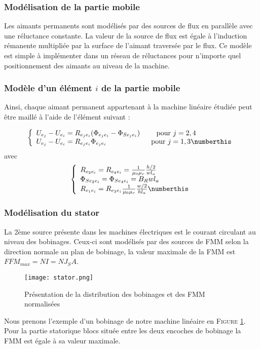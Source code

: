 \subsubsection{Modélisation de la partie mobile}
Les aimants permanents sont modélisés par des sources de flux en parallèle avec une réluctance constante. La valeur de la source de flux est égale à l’induction rémanente
multipliée par la surface de l’aimant traversée par le flux. Ce modèle est simple à implémenter dans un réseau de réluctances pour n’importe quel positionnement des aimants au niveau de la machine.

\subsubsection*{Modèle d'un élément $i$ de la partie mobile}
Ainsi, chaque aimant permanent appartenant à la machine linéaire étudiée peut être maillé à l'aide de l'élément suivant  : 

\[
\left\{
\begin{array}{l c l}
U_{e_j}-U_{e_i}=R_{e_je_i}(\Phi_{e_je_i}-\Phi_{Se_je_i}) \qquad \text{ pour } j=2,4 \\
U_{e_j}-U_{e_i}=R_{e_je_i}\Phi_{e_je_i} \qquad \qquad\qquad  \text{ pour } j=1,3 \numberthis
\end{array}
\right.
\]
avec
\[
\left\{
\begin{array}{l c l}
R_{e_2e_i}=R_{e_4e_i}=\frac{1}{\mu_0\mu_r}\frac{h/2}{wl_a}\\
\Phi_{Se_2e_i}=\Phi_{Se_4e_i}=B_Rwl_a\\
R_{e_1e_i}=R_{e_3e_i}\frac{1}{\mu_0\mu_r}\frac{w/2}{hl_a} \numberthis
\end{array}
\right.
\]

\subsubsection{Modélisation du stator}
La 2ème source présente dans les machines électriques est le courant circulant au niveau des
bobinages. Ceux-ci sont modélisés par des sources de FMM
selon la direction normale au plan de bobinage, la valeur maximale de la FMM est $FFM_{max}=NI=NJ_SA$.

\begin{figure}[H]
    \centering
    \texttt{[image: stator.png]}
    \caption{Présentation de la distribution des bobinages et des FMM normalisées}
    \label{stator}
\end{figure}

Nous prenons l’exemple d’un bobinage de notre machine linéaire en \textsc{Figure \ref{stator}}. Pour la partie statorique
blocs située entre les deux encoches de bobinage la FMM est égale à sa valeur maximale.

